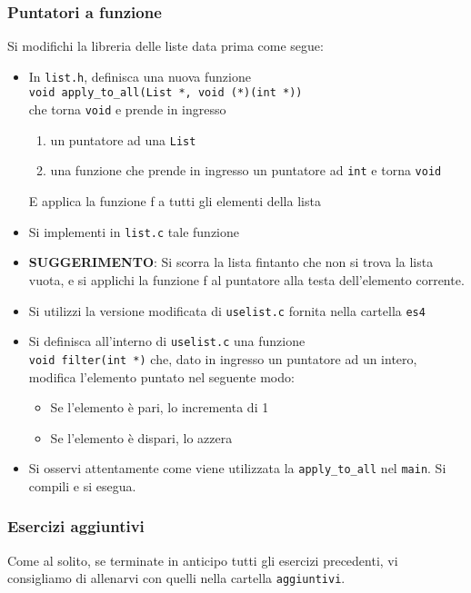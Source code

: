 \documentclass{beamer}
\begin{document}
\begin{frame}[fragile]
\frametitle{Puntatori a funzione}
Si modifichi la libreria delle liste data prima come segue:
\begin{itemize}
 \item In \texttt{list.h}, definisca una nuova funzione\\ \texttt{void apply\_to\_all(List *, void (*)(int *))}\\ che torna \texttt{void} e prende in ingresso
 \begin{enumerate}
  \scriptsize
  \item un puntatore ad una \texttt{List}
  \item una funzione che prende in ingresso un puntatore ad \texttt{int} e torna \texttt{void}
 \end{enumerate}
 E applica la funzione f a tutti gli elementi della lista
 \item Si implementi in \texttt{list.c} tale funzione
 \scriptsize
 \item \textbf{SUGGERIMENTO}: Si scorra la lista fintanto che non si trova la lista vuota, e si applichi la funzione f al puntatore alla testa dell'elemento corrente.
 \normalsize
 \item Si utilizzi la versione modificata di \texttt{uselist.c} fornita nella cartella \texttt{es4}
 \item Si definisca all'interno di \texttt{uselist.c} una funzione \\ \texttt{void filter(int *)} che, dato in ingresso un puntatore ad un intero, modifica l'elemento puntato nel seguente modo:
 \begin{itemize}
  \item Se l'elemento è pari, lo incrementa di 1
  \item Se l'elemento è dispari, lo azzera
 \end{itemize}
 \item Si osservi attentamente come viene utilizzata la \texttt{apply\_to\_all} nel \texttt{main}. Si compili e si esegua.
\end{itemize}
\end{frame}

\begin{frame}[fragile]
\frametitle{Esercizi aggiuntivi}
Come al solito, se terminate in anticipo tutti gli esercizi precedenti, vi consigliamo di allenarvi con quelli nella cartella \texttt{aggiuntivi}.
\end{frame}
\end{document}
